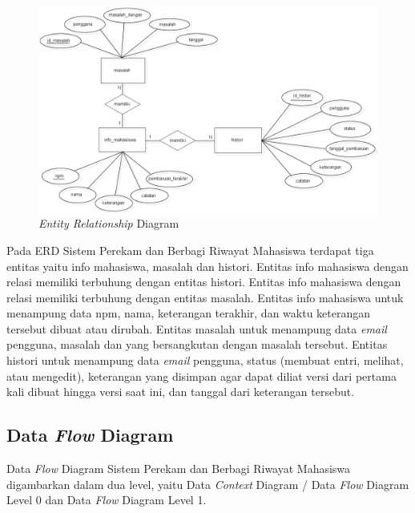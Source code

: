 \begin{figure}[ht]
\centering
\includegraphics[scale=0.4]{Gambar/ERD.png}
\caption[{\it Entity Relationship} Diagram]{{\it Entity Relationship} Diagram} 
\label{fig:erd}
\end{figure}

Pada ERD Sistem Perekam dan Berbagi Riwayat Mahasiswa terdapat tiga entitas yaitu info mahasiswa, masalah dan histori. Entitas info mahasiswa dengan relasi memiliki terbuhung dengan entitas histori. Entitas info mahasiswa dengan relasi memiliki terbuhung dengan entitas masalah. Entitas info mahasiswa untuk menampung data npm, nama, keterangan terakhir, dan waktu keterangan tersebut dibuat atau dirubah. Entitas masalah untuk menampung data {\it email} pengguna, masalah dan yang bersangkutan dengan masalah tersebut. Entitas histori untuk menampung data {\it email} pengguna, status (membuat entri, melihat, atau mengedit), keterangan yang disimpan agar dapat diliat versi dari pertama kali dibuat hingga versi saat ini, dan tanggal dari keterangan tersebut. 

\subsection{Data {\it Flow} Diagram}
Data {\it Flow} Diagram Sistem Perekam dan Berbagi Riwayat Mahasiswa digambarkan dalam dua level, yaitu Data {\it Context} Diagram / Data {\it Flow} Diagram Level 0 dan Data {\it Flow} Diagram Level 1.

